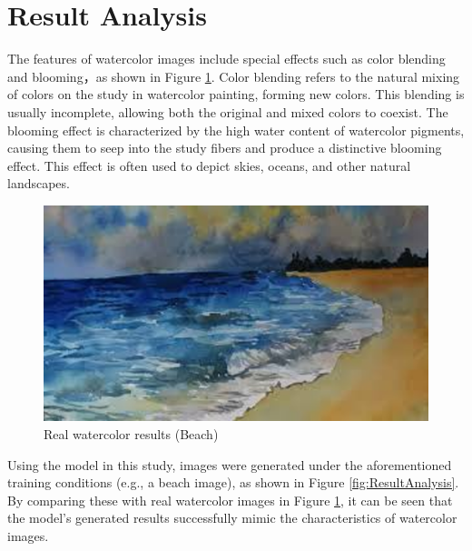 \documentclass[12pt]{report}
\begin{document}
\section{Result Analysis}
The features of watercolor images include special effects such as color blending and blooming，as shown in Figure \ref{fig:tureImage}. Color blending refers to the natural mixing of colors on the study in watercolor painting, forming new colors. This blending is usually incomplete, allowing both the original and mixed colors to coexist. The blooming effect is characterized by the high water content of watercolor pigments, causing them to seep into the study fibers and produce a distinctive blooming effect. This effect is often used to depict skies, oceans, and other natural landscapes.

\begin{figure}[htbp]
    \centering
    \includegraphics[width=14cm]{image/tureImage.png}
    \caption{Real watercolor results (Beach)}
    \label{fig:tureImage}
\end{figure}

Using the model in this study, images were generated under the aforementioned training conditions (e.g., a beach image), as shown in Figure \ref{fig:ResultAnalysis}. By comparing these with real watercolor images in Figure \ref{fig:tureImage}, it can be seen that the model's generated results successfully mimic the characteristics of watercolor images. 
\end{document}
